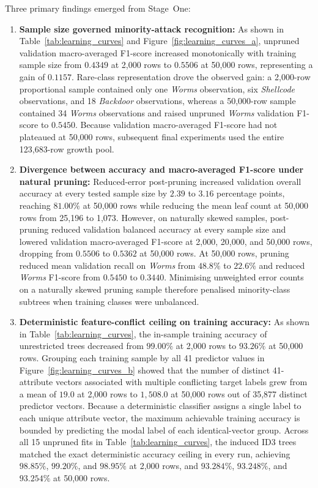 Three primary findings emerged from Stage~One:
\begin{enumerate}
    \item \textbf{Sample size governed minority-attack recognition:} As shown in Table~\ref{tab:learning_curves} and Figure~\ref{fig:learning_curves_a}, unpruned validation macro-averaged F1-score increased monotonically with training sample size from $0.4349$ at 2,000 rows to $0.5506$ at 50,000 rows, representing a gain of $0.1157$. Rare-class representation drove the observed gain: a 2,000-row proportional sample contained only one \emph{Worms} observation, six \emph{Shellcode} observations, and 18 \emph{Backdoor} observations, whereas a 50,000-row sample contained 34 \emph{Worms} observations and raised unpruned \emph{Worms} validation F1-score to $0.5450$. Because validation macro-averaged F1-score had not plateaued at 50,000 rows, subsequent final experiments used the entire 123,683-row growth pool.
    \item \textbf{Divergence between accuracy and macro-averaged F1-score under natural pruning:} Reduced-error post-pruning increased validation overall accuracy at every tested sample size by $2.39$ to $3.16$ percentage points, reaching $81.00\%$ at 50,000 rows while reducing the mean leaf count at 50,000 rows from 25,196 to 1,073. However, on naturally skewed samples, post-pruning reduced validation balanced accuracy at every sample size and lowered validation macro-averaged F1-score at 2,000, 20,000, and 50,000 rows, dropping from $0.5506$ to $0.5362$ at 50,000 rows. At 50,000 rows, pruning reduced mean validation recall on \emph{Worms} from $48.8\%$ to $22.6\%$ and reduced \emph{Worms} F1-score from $0.5450$ to $0.3440$. Minimising unweighted error counts on a naturally skewed pruning sample therefore penalised minority-class subtrees when training classes were unbalanced.
    \item \textbf{Deterministic feature-conflict ceiling on training accuracy:} As shown in Table~\ref{tab:learning_curves}, the in-sample training accuracy of unrestricted trees decreased from $99.00\%$ at 2,000 rows to $93.26\%$ at 50,000 rows. Grouping each training sample by all 41 predictor values in Figure~\ref{fig:learning_curves_b} showed that the number of distinct 41-attribute vectors associated with multiple conflicting target labels grew from a mean of $19.0$ at 2,000 rows to $1{,}508.0$ at 50,000 rows out of 35,877 distinct predictor vectors. Because a deterministic classifier assigns a single label to each unique attribute vector, the maximum achievable training accuracy is bounded by predicting the modal label of each identical-vector group. Across all 15 unpruned fits in Table~\ref{tab:learning_curves}, the induced ID3 trees matched the exact deterministic accuracy ceiling in every run, achieving $98.85\%$, $99.20\%$, and $98.95\%$ at 2,000 rows, and $93.284\%$, $93.248\%$, and $93.254\%$ at 50,000 rows.
\end{enumerate}

